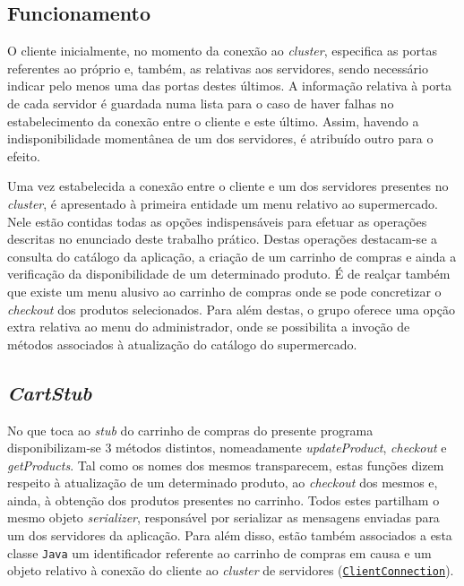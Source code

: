 \documentclass[a4paper]{report}
\begin{document}
{		\subsection{Funcionamento} \label{subsec:ClientWorking}
		O cliente inicialmente, no momento da conexão ao \textit{cluster}, especifica as portas referentes ao próprio e, também, as relativas aos servidores, sendo necessário indicar pelo menos uma das portas destes últimos.
		A informação relativa à porta de cada servidor é guardada numa lista para o caso de haver falhas no estabelecimento da conexão entre o cliente e este último. Assim, havendo a indisponibilidade momentânea de um dos servidores, é atribuído outro para o efeito.

		Uma vez estabelecida a conexão entre o cliente e um dos servidores presentes no \textit{cluster}, é apresentado à primeira entidade um menu relativo ao supermercado. Nele estão contidas todas as opções indispensáveis para efetuar as operações descritas no enunciado deste trabalho prático.
		Destas operações destacam-se a consulta do catálogo da aplicação, a criação de um carrinho de compras e ainda a verificação da disponibilidade de um determinado produto.
		É de realçar também que existe um menu alusivo ao carrinho de compras onde se pode concretizar o \textit{checkout} dos produtos selecionados.
		Para além destas, o grupo oferece uma opção extra relativa ao menu do administrador, onde se possibilita a invoção de métodos associados à atualização do catálogo do supermercado.

		\subsection{\textit{CartStub}} \label{subsec:ClientCartStub}
		No que toca ao \textit{stub} do carrinho de compras do presente programa disponibilizam-se 3 métodos distintos, nomeadamente \textit{updateProduct}, \textit{checkout} e \textit{getProducts}.
		Tal como os nomes dos mesmos transparecem, estas funções dizem respeito à atualização de um determinado produto, ao \textit{checkout} dos mesmos e, ainda, à obtenção dos produtos presentes no carrinho.
		Todos estes partilham o mesmo objeto \textit{serializer}, responsável por serializar as mensagens enviadas para um dos servidores da aplicação.
		Para além disso, estão também associados a esta classe \texttt{Java} um identificador referente ao carrinho de compras em causa e um objeto relativo à conexão do cliente ao \textit{cluster} de servidores (\hyperref[subsec:ClientConnection]{\texttt{ClientConnection}}).

}
\end{document}

